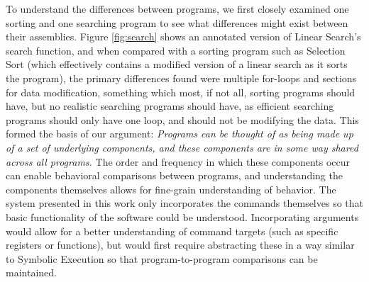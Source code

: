To understand the differences between programs, we first closely examined one sorting and one searching program to see what differences might exist between their assemblies. Figure \ref{fig:search} shows an annotated version of Linear Search's search function, and when compared with a sorting program such as Selection Sort (which effectively contains a modified version of a linear search as it sorts the program), the primary differences found were multiple for-loops and sections for data modification, something which most, if not all, sorting programs should have, but no realistic searching programs should have, as efficient searching programs should only have one loop, and should not be modifying the data. This formed the basis of our argument: \textit{Programs can be thought of as being made up of a set of underlying components, and these components are in some way shared across all programs.} The order and frequency in which these components occur can enable behavioral comparisons between programs, and understanding the components themselves allows for fine-grain understanding of behavior. The system presented in this work only incorporates the commands themselves so that basic functionality of the software could be understood. Incorporating arguments would allow for a better understanding of command targets (such as specific registers or functions), but would first require abstracting these in a way similar to Symbolic Execution so that program-to-program comparisons can be maintained.
